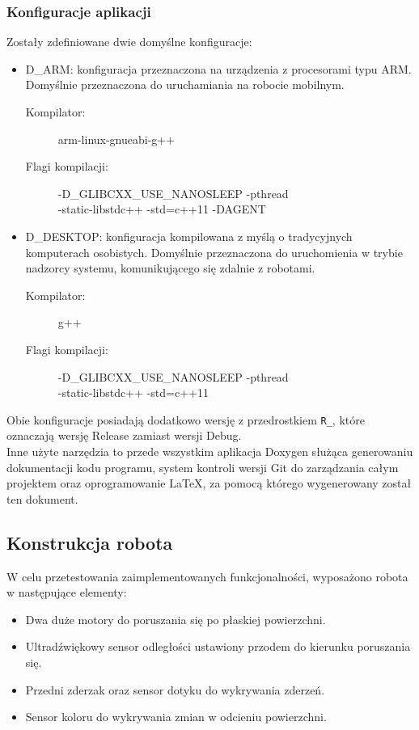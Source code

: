 \subsubsection{Konfiguracje aplikacji}
Zostały zdefiniowane dwie domyślne konfiguracje:
\begin{itemize}
    \item D\_ARM: konfiguracja przeznaczona na urządzenia z procesorami typu ARM. Domyślnie przeznaczona do uruchamiania na robocie mobilnym.
    \begin{description}
        \item[{\small Kompilator:}] {\small arm-linux-gnueabi-g++}
        \item[{\small Flagi kompilacji:}] {\small -D\_GLIBCXX\_USE\_NANOSLEEP -pthread\\ -static-libstdc++ -std=c++11 -DAGENT}
    \end{description}
    \item D\_DESKTOP: konfiguracja kompilowana z myślą o tradycyjnych komputerach osobistych. Domyślnie przeznaczona do uruchomienia w trybie nadzorcy systemu, komunikującego się zdalnie z robotami.
    \begin{description}
        \item[{\small Kompilator:}] {\small g++}
        \item[{\small Flagi kompilacji:}] {\small -D\_GLIBCXX\_USE\_NANOSLEEP -pthread\\ -static-libstdc++ -std=c++11}
    \end{description}
\end{itemize}
\noindent Obie konfiguracje posiadają dodatkowo wersję z przedrostkiem {\tt R\_}, które oznaczają wersję Release zamiast wersji Debug.\\

Inne użyte narzędzia to przede wszystkim aplikacja Doxygen służąca generowaniu dokumentacji kodu programu, system kontroli wersji Git do zarządzania całym projektem oraz oprogramowanie LaTeX, za pomocą którego wygenerowany został ten dokument.

\subsection{Konstrukcja robota}
W celu przetestowania zaimplementowanych funkcjonalności, wyposażono robota w następujące elementy:
\begin{itemize}
    \item Dwa duże motory do poruszania się po płaskiej powierzchni.
    \item Ultradźwiękowy sensor odległości ustawiony przodem do kierunku poruszania się.
    \item Przedni zderzak oraz sensor dotyku do wykrywania zderzeń.
    \item Sensor koloru do wykrywania zmian w odcieniu powierzchni.
\end{itemize}
